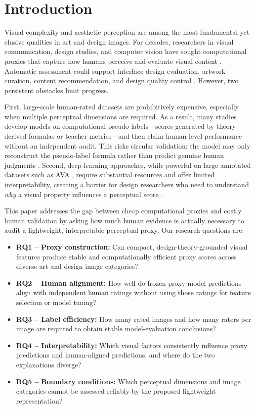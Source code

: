 
\section{Introduction}
\label{sec:intro}

Visual complexity and aesthetic perception are among the most fundamental yet elusive qualities in art and design images. For decades, researchers in visual communication, design studies, and computer vision have sought computational proxies that capture how humans perceive and evaluate visual content \citep{berlyne1971aesthetics, leder2004model}. Automatic assessment could support interface design evaluation, artwork curation, content recommendation, and design quality control \citep{zhang2020survey}. However, two persistent obstacles limit progress.

First, large-scale human-rated datasets are prohibitively expensive, especially when multiple perceptual dimensions are required. As a result, many studies develop models on computational pseudo-labels---scores generated by theory-derived formulas or teacher metrics---and then claim human-level performance without an independent audit. This risks circular validation: the model may only reconstruct the pseudo-label formula rather than predict genuine human judgments \citep{damasio2022visual}. Second, deep-learning approaches, while powerful on large annotated datasets such as AVA \citep{murray2012ava}, require substantial resources and offer limited interpretability, creating a barrier for design researchers who need to understand \textit{why} a visual property influences a perceptual score \citep{li2023interpretable}.

This paper addresses the gap between cheap computational proxies and costly human validation by asking how much human evidence is actually necessary to audit a lightweight, interpretable perceptual proxy. Our research questions are:

\begin{itemize}
    \item \textbf{RQ1 -- Proxy construction:} Can compact, design-theory-grounded visual features produce stable and computationally efficient proxy scores across diverse art and design image categories?
    \item \textbf{RQ2 -- Human alignment:} How well do frozen proxy-model predictions align with independent human ratings without using those ratings for feature selection or model tuning?
    \item \textbf{RQ3 -- Label efficiency:} How many rated images and how many raters per image are required to obtain stable model-evaluation conclusions?
    \item \textbf{RQ4 -- Interpretability:} Which visual factors consistently influence proxy predictions and human-aligned predictions, and where do the two explanations diverge?
    \item \textbf{RQ5 -- Boundary conditions:} Which perceptual dimensions and image categories cannot be assessed reliably by the proposed lightweight representation?
\end{itemize}

